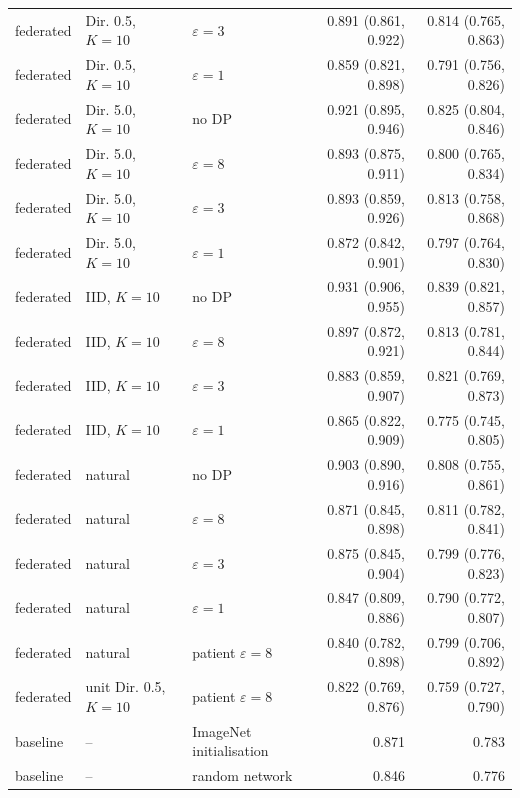 {\begin{longtable}{lllrr}
federated & Dir. 0.5, $K{=}10$ & $\varepsilon=3$ & 0.891 (0.861, 0.922) & 0.814 (0.765, 0.863) \\
federated & Dir. 0.5, $K{=}10$ & $\varepsilon=1$ & 0.859 (0.821, 0.898) & 0.791 (0.756, 0.826) \\
federated & Dir. 5.0, $K{=}10$ & no DP & 0.921 (0.895, 0.946) & 0.825 (0.804, 0.846) \\
federated & Dir. 5.0, $K{=}10$ & $\varepsilon=8$ & 0.893 (0.875, 0.911) & 0.800 (0.765, 0.834) \\
federated & Dir. 5.0, $K{=}10$ & $\varepsilon=3$ & 0.893 (0.859, 0.926) & 0.813 (0.758, 0.868) \\
federated & Dir. 5.0, $K{=}10$ & $\varepsilon=1$ & 0.872 (0.842, 0.901) & 0.797 (0.764, 0.830) \\
federated & IID, $K{=}10$ & no DP & 0.931 (0.906, 0.955) & 0.839 (0.821, 0.857) \\
federated & IID, $K{=}10$ & $\varepsilon=8$ & 0.897 (0.872, 0.921) & 0.813 (0.781, 0.844) \\
federated & IID, $K{=}10$ & $\varepsilon=3$ & 0.883 (0.859, 0.907) & 0.821 (0.769, 0.873) \\
federated & IID, $K{=}10$ & $\varepsilon=1$ & 0.865 (0.822, 0.909) & 0.775 (0.745, 0.805) \\
federated & natural & no DP & 0.903 (0.890, 0.916) & 0.808 (0.755, 0.861) \\
federated & natural & $\varepsilon=8$ & 0.871 (0.845, 0.898) & 0.811 (0.782, 0.841) \\
federated & natural & $\varepsilon=3$ & 0.875 (0.845, 0.904) & 0.799 (0.776, 0.823) \\
federated & natural & $\varepsilon=1$ & 0.847 (0.809, 0.886) & 0.790 (0.772, 0.807) \\
federated & natural & patient $\varepsilon=8$ & 0.840 (0.782, 0.898) & 0.799 (0.706, 0.892) \\
federated & unit Dir. 0.5, $K{=}10$ & patient $\varepsilon=8$ & 0.822 (0.769, 0.876) & 0.759 (0.727, 0.790) \\
baseline & -- & ImageNet initialisation & 0.871 & 0.783 \\
baseline & -- & random network & 0.846 & 0.776 \\
\end{longtable}}

